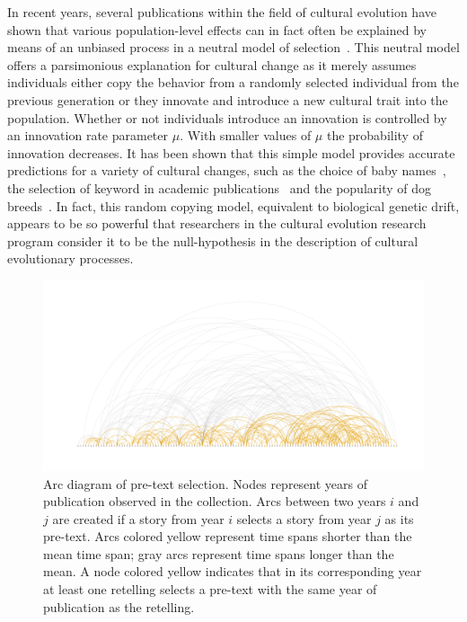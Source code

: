 In recent years, several publications within the field of cultural evolution have shown that various population-level effects can in fact often be explained by means of an unbiased process in a neutral model of selection~\autocite[See e.g.][]{Bentley:2004,Mesoudi:2009}. This neutral model offers a parsimonious explanation for cultural change as it merely assumes individuals either copy the behavior from a randomly selected individual from the previous generation or they innovate and introduce a new cultural trait into the population. Whether or not individuals introduce an innovation is controlled by an innovation rate parameter $\mu$. With smaller values of $\mu$ the probability of innovation decreases. It has been shown that this simple model provides accurate predictions for a variety of cultural changes, such as the choice of baby names~\autocite{Hahn:2003}, the selection of keyword in academic publications~\autocite{Bentley:2008} and the popularity of dog breeds~\autocite{herzog:2004}. In fact, this random copying model, equivalent to biological genetic drift, appears to be so powerful that researchers in the cultural evolution research program consider it to be the null-hypothesis in the description of cultural evolutionary processes. 

\begin{figure}
\centering
\includegraphics[width=\textwidth]{images/arcdiagram}
\caption{Arc diagram of pre-text selection. Nodes represent years of publication observed in the collection. Arcs between two years $i$ and $j$ are created if a story from year $i$ selects a story from year $j$ as its pre-text. Arcs colored yellow represent time spans shorter than the mean time span; gray arcs represent time spans longer than the mean. A node colored yellow indicates that in its corresponding year at least one retelling selects a pre-text with the same year of publication as the retelling.}
\label{fig:arcdiagram}
\end{figure}

